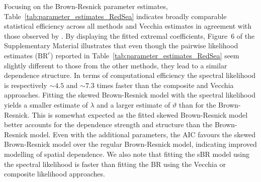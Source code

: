 \documentclass[12pt]{article}
\begin{document}
Focusing on the Brown-Resnick parameter estimates, Table~\ref{tab:parameter_estimates_RedSea} indicates broadly comparable statistical efficiency 
across all
methods and Vecchia estimates in agreement with those observed by \citet{Huser.Zhong:2023}. By displaying the fitted extremal coefficients, Figure~6 of the Supplementary Material illustrates that even though the pairwise likelihood estimates ($\textrm{BR}^c$) reported in Table~\ref{tab:parameter_estimates_RedSea} seem slightly different to those from the other methods, they lead to a similar dependence structure. In terms of computational efficiency the spectral likelihood is respectively $\sim 4.5$ and $\sim 7.3$ times 
faster than the composite and Vecchia approaches. 
%
%
% 
%
Fitting the skewed Brown-Resnick model with the spectral likelihood yields a smaller estimate of $\lambda$ and  a larger estimate of $\vartheta$ than for the Brown-Resnick. This is somewhat expected as the fitted skewed Brown-Resnick model better accounts for the dependence strength and structure than the Brown-Resnick model. 
Even with the additional parameters, the AIC favours the skewed Brown-Resnick model over the regular Brown-Resnick model, indicating improved modelling of spatial dependence. 
We also note that fitting the sBR model using the spectral likelihood is faster than fitting the BR using the Vecchia or composite likelihood approaches.
\end{document}
